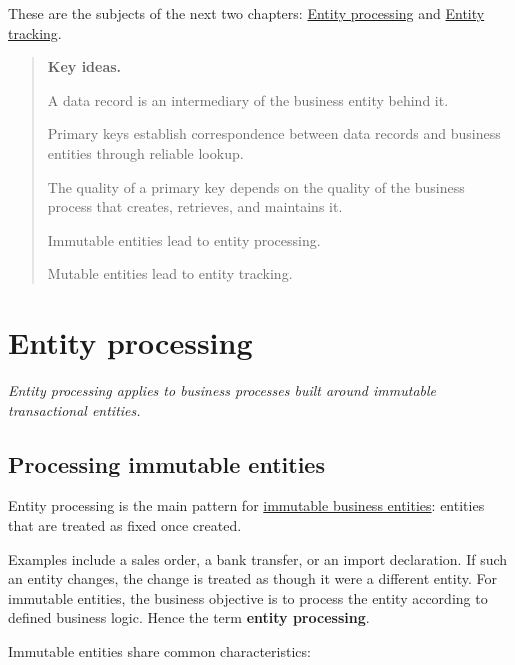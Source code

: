 \documentclass[10pt,openany,10pt]{book}
\begin{document}
These are the subjects of the next two chapters:
\hyperref[docs-creating-information-entity-processing]{Entity
processing} and
\hyperref[docs-creating-information-entity-tracking]{Entity tracking}.

\begin{quote}
\textbf{Key ideas.}

A data record is an intermediary of the business entity behind it.

Primary keys establish correspondence between data records and business
entities through reliable lookup.

The quality of a primary key depends on the quality of the business
process that creates, retrieves, and maintains it.

Immutable entities lead to entity processing.

Mutable entities lead to entity tracking.
\end{quote}

\newpage

\chapter{Entity
processing}\label{docs-creating-information-entity-processing}

\emph{Entity processing applies to business processes built around
immutable transactional entities.}

\section{Processing immutable
entities}\label{processing-immutable-entities}

Entity processing is the main pattern for
\hyperref[docs-creating-information-mapping-the-data-world]{immutable
business entities}: entities that are treated as fixed once created.

Examples include a sales order, a bank transfer, or an import
declaration. If such an entity changes, the change is treated as though
it were a different entity. For immutable entities, the business
objective is to process the entity according to defined business logic.
Hence the term \textbf{entity processing}.

Immutable entities share common characteristics:
\end{document}
